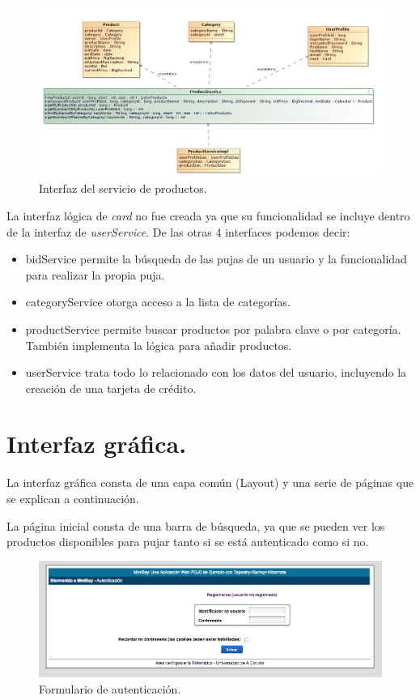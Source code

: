 \documentclass[12pt,a4paper,twoside,spanish]{article}      %
\begin{document}
\begin{figure}[H]
    \includegraphics[angle=90,scale=0.8]{ProductService}
  \caption{Interfaz del servicio de productos.}
  \label{fig:ProductService}
\end{figure}

La interfaz lógica de \textit{card} no fue creada ya que su funcionalidad se incluye dentro de la interfaz de \textit{userService}.
De las otras 4 interfaces podemos decir:
\begin{itemize}
 \item bidService permite la búsqueda de las pujas de un usuario y la funcionalidad para realizar la propia puja.
 \item categoryService otorga acceso a la lista de categorías.
 \item productService permite buscar productos por palabra clave o por categoría. También implementa la lógica para añadir productos.
 \item userService trata todo lo relacionado con los datos del usuario, incluyendo la creación de una tarjeta de crédito.
\end{itemize}

\section{Interfaz gráfica.}
La interfaz gráfica consta de una capa común (Layout) y una serie de páginas que se explican a continuación.


La página inicial consta de una barra de búsqueda, ya que se pueden ver los productos disponibles para pujar tanto si se está
autenticado como si no.

\begin{figure}[H]
  \centering
    \includegraphics[width=1\textwidth]{autenticacion.png}
  \caption{Formulario de autenticación.}
  \label{fig:Autenticacion}
\end{figure}
\end{document}
